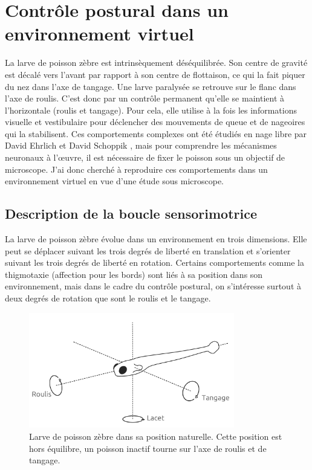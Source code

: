 \chapter[Contrôle postural en VR]{Contrôle postural dans un environnement virtuel}\label{chapII}

La larve de poisson zèbre est intrinsèquement déséquilibrée. Son centre de gravité est décalé vers l'avant par rapport à son centre de flottaison, ce qui la fait piquer du nez dans l'axe de tangage. Une larve paralysée se retrouve sur le flanc dans l'axe de roulis. C'est donc par un contrôle permanent qu'elle se maintient à l'horizontale (roulis et tangage). Pour cela, elle utilise à la fois les informations visuelle et vestibulaire pour déclencher des mouvements de queue et de nageoires qui la stabilisent. Ces comportements complexes ont été étudiés en nage libre par David Ehrlich et David Schoppik \cite{ehrlich_control_2017}\cite{ehrlich_balance_2018}\cite{ehrlich_primal_2019}, mais pour comprendre les mécanismes neuronaux à l'œuvre, il est nécessaire de fixer le poisson sous un objectif de microscope. J'ai donc cherché à reproduire ces comportements dans un environnement virtuel en vue d'une étude sous microscope.

\section{Description de la boucle sensorimotrice}

La larve de poisson zèbre évolue dans un environnement en trois dimensions. Elle peut se déplacer suivant les trois degrés de liberté en translation et s'orienter suivant les trois degrés de liberté en rotation. Certains comportements comme la thigmotaxie (affection pour les bords) sont liés à sa position dans son environnement, mais dans le cadre du contrôle postural, on s'intéresse surtout à deux degrés de rotation que sont le roulis et le tangage.

\begin{figure}
\centering
\includegraphics[width=0.8\textwidth]{./files/fish.png}
\caption{Larve de poisson zèbre dans sa position naturelle. Cette position est hors équilibre, un poisson inactif tourne sur l'axe de roulis et de tangage.}
\end{figure}

